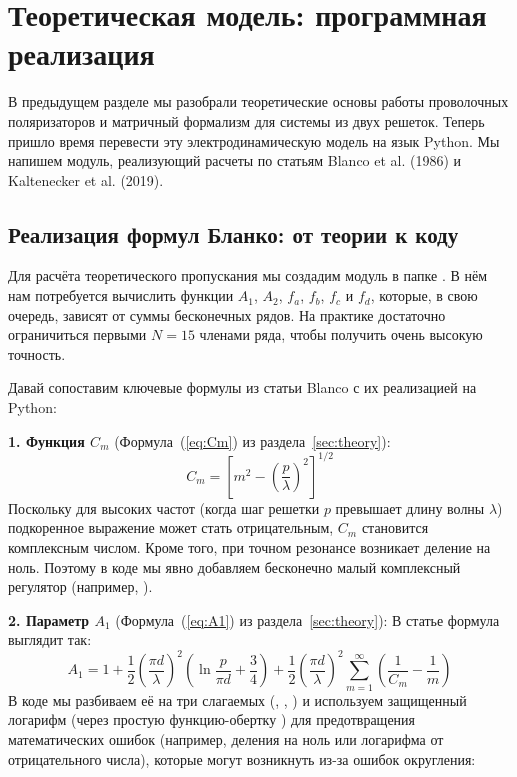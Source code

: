 
\section{Теоретическая модель: программная реализация}

В предыдущем разделе мы разобрали теоретические основы работы проволочных поляризаторов и матричный формализм для системы из двух решеток. Теперь пришло время перевести эту электродинамическую модель на язык Python. Мы напишем модуль, реализующий расчеты по статьям Blanco et al. (1986) и Kaltenecker et al. (2019).

\subsection{Реализация формул Бланко: от теории к коду}

Для расчёта теоретического пропускания мы создадим модуль  в папке . В нём нам потребуется вычислить функции $A_1$, $A_2$, $f_a$, $f_b$, $f_c$ и $f_d$, которые, в свою очередь, зависят от суммы бесконечных рядов. На практике достаточно ограничиться первыми $N=15$ членами ряда, чтобы получить очень высокую точность.

Давай сопоставим ключевые формулы из статьи Blanco с их реализацией на Python:

\textbf{1. Функция $C_m$} (Формула~(\ref{eq:Cm}) из раздела~\ref{sec:theory}):
\begin{equation*}
C_m = \left[ m^2 - \left(\frac{p}{\lambda}\right)^2 \right]^{1/2}
\end{equation*}
Поскольку для высоких частот (когда шаг решетки $p$ превышает длину волны $\lambda$) подкоренное выражение может стать отрицательным, $C_m$ становится комплексным числом. Кроме того, при точном резонансе возникает деление на ноль. Поэтому в коде мы явно добавляем бесконечно малый комплексный регулятор  (например, ).

\textbf{2. Параметр $A_1$} (Формула~(\ref{eq:A1}) из раздела~\ref{sec:theory}):
В статье формула выглядит так:
\begin{equation*}
A_1 = 1 + \frac{1}{2}\left(\frac{\pi d}{\lambda}\right)^2 \left( \ln\frac{p}{\pi d} + \frac{3}{4} \right) + \frac{1}{2}\left(\frac{\pi d}{\lambda}\right)^2 \sum_{m=1}^\infty \left( \frac{1}{C_m} - \frac{1}{m} \right)
\end{equation*}
В коде мы разбиваем её на три слагаемых (, , ) и используем защищенный логарифм (через простую функцию-обертку ) для предотвращения математических ошибок (например, деления на ноль или логарифма от отрицательного числа), которые могут возникнуть из-за ошибок округления:

